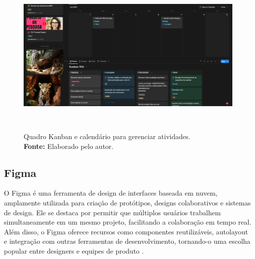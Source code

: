 \begin{figure}[H]
    \centering
    \includegraphics[height=8cm, keepaspectratio]{img/Notion/kanban.png}
    \caption{ Quadro Kanban e calendário para gerenciar atividades. \\
        \textbf{Fonte:} Elaborado pelo autor.}
    \label{fig:kanban notion}
\end{figure}


\subsection{Figma}
O Figma é uma ferramenta de design de interfaces baseada em nuvem, amplamente utilizada para criação de protótipos, designs colaborativos e sistemas de design. Ele se destaca por permitir que múltiplos usuários trabalhem simultaneamente em um mesmo projeto, facilitando a colaboração em tempo real. Além disso, o Figma oferece recursos como componentes reutilizáveis, autolayout e integração com outras ferramentas de desenvolvimento, tornando-o uma escolha popular entre designers e equipes de produto \citep{figma}.



